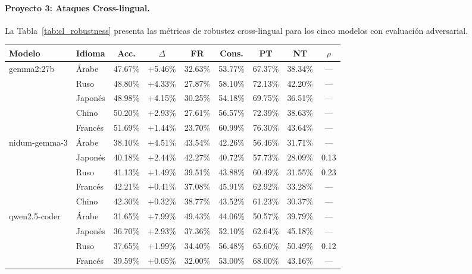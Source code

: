 \documentclass[11pt]{article}
\begin{document}
\paragraph{Proyecto 3: Ataques Cross-lingual.}
 
La Tabla~\ref{tab:cl_robustness} presenta las métricas de robustez
cross-lingual para los cinco modelos con evaluación adversarial.
 
\begin{table}[t]
  \centering\small
  \begin{tabular}{llccccccc}
    \toprule
    \textbf{Modelo} & \textbf{Idioma} & \textbf{Acc.} &
    \textbf{$\Delta$} & \textbf{FR} & \textbf{Cons.} &
    \textbf{PT} & \textbf{NT} & \textbf{$\rho$} \\
    \midrule
    \multirow{5}{*}{gemma2:27b}
      & Árabe   & 47.67\% & +5.46\% & 32.63\% & 53.77\% & 67.37\% & 38.34\% & — \\
      & Ruso    & 48.80\% & +4.33\% & 27.87\% & 58.10\% & 72.13\% & 42.20\% & — \\
      & Japonés & 48.98\% & +4.15\% & 30.25\% & 54.18\% & 69.75\% & 36.51\% & — \\
      & Chino   & 50.20\% & +2.93\% & 27.61\% & 56.57\% & 72.39\% & 38.63\% & — \\
      & Francés & 51.69\% & +1.44\% & 23.70\% & 60.99\% & 76.30\% & 43.64\% & — \\
    \midrule
    \multirow{5}{*}{nidum-gemma-3}
      & Árabe   & 38.10\% & +4.51\% & 43.54\% & 42.26\% & 56.46\% & 31.71\% & — \\
      & Japonés & 40.18\% & +2.44\% & 42.27\% & 40.72\% & 57.73\% & 28.09\% & 0.13 \\
      & Ruso    & 41.13\% & +1.49\% & 39.51\% & 43.88\% & 60.49\% & 31.55\% & 0.23 \\
      & Francés & 42.21\% & +0.41\% & 37.08\% & 45.91\% & 62.92\% & 33.28\% & — \\
      & Chino   & 42.30\% & +0.32\% & 38.77\% & 43.52\% & 61.23\% & 30.37\% & — \\
    \midrule
    \multirow{5}{*}{qwen2.5-coder}
      & Árabe   & 31.65\% & +7.99\% & 49.43\% & 44.06\% & 50.57\% & 39.79\% & — \\
      & Japonés & 36.70\% & +2.93\% & 37.36\% & 52.10\% & 62.64\% & 45.18\% & — \\
      & Ruso    & 37.65\% & +1.99\% & 34.40\% & 56.48\% & 65.60\% & 50.49\% & 0.12 \\
      & Francés & 39.59\% & +0.05\% & 32.00\% & 53.00\% & 68.00\% & 43.16\% & — \\

\end{tabular}
\end{table}
\end{document}
